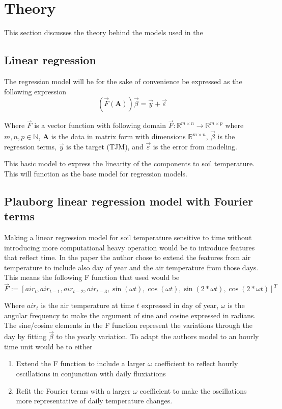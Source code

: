 \section{Theory}\label{sec:theory}

This section discusses the theory behind the models used in the 

\subsection{Linear regression}\label{sec:theory:linreg}

The regression model will be for the sake of convenience be expressed as the following expression
$$
\left(\vec{F}(\mathbf{A})\right)\vec{\beta}=\vec{y}+\vec{\varepsilon}
$$

Where $\vec{F}$ is a vector function with following domain $\vec{F}:\mathbb{R}^{m\times n}\to \mathbb{R}^{m\times p}$ where $m,n,p\in \mathbb{N}$, $\mathbf{A}$ is the data in matrix form with dimensions $\mathbb{R}^{m\times n}$, $\vec{\beta}$ is the regression terms, $\vec{y}$ is the target (TJM), and $\vec{\varepsilon}$ is the error from modeling.

This basic model to express the linearity of the components to soil temperature. This will function as the base model for regression models. 

\subsection[Plauborg Regression]{Plauborg linear regression model with Fourier terms}\label{sec:theory:pluborg}

Making a linear regression model for soil temperature sensitive to time without introducing more computational heavy operation would be to introduce features that reflect time. In the paper  the author chose to extend the features from air temperature to include also day of year and the air temperature from those days. This means the following F function that \citeauthor{plauborg_simple_2002} used would be 
$$
\vec{F} := [air_t , air_{t-1}, air_{t-2}, air_{t-3}, \sin(\omega t) , \cos(\omega t), \sin(2*\omega t), \cos(2*\omega t)]^T
$$

Where $air_t$ is the air temperature at time $t$ expressed in day of year, $\omega$ is the angular frequency to make the argument of sine and cosine expressed in radians. The sine/cosine elements in the F function represent the variations through the day by fitting $\vec{\beta}$ to the yearly variation. To adapt the authors model to an hourly time unit would be to either
\begin{enumerate}
	\item Extend the F function to include a larger $\omega$ coefficient to reflect hourly oscillations in conjunction with daily fluxiations
	\item Refit the Fourier terms with a larger $\omega$ coefficient to make the oscillations more representative of daily temperature changes.
\end{enumerate}

